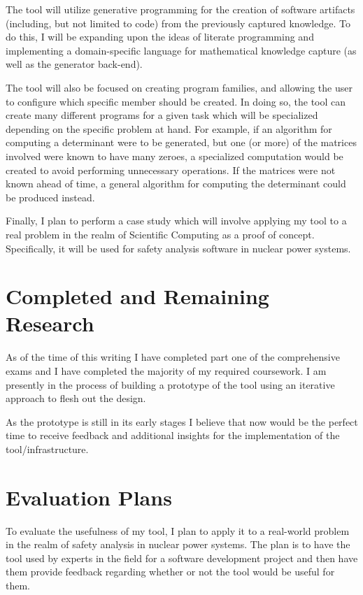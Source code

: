 \documentclass[11pt]{article} %
\begin{document}
The tool will utilize generative programming for the creation of software
artifacts (including, but not limited to code) from the previously captured
knowledge. To do this, I will be expanding upon the ideas of literate
programming and implementing a domain-specific language for mathematical
knowledge capture (as well as the generator back-end).

The tool will also be focused on creating program families, and allowing the
user to configure which specific member should be created. In doing so, the tool
can create many different programs for a given task which will be specialized
depending on the specific problem at hand. For example, if an algorithm for
computing a determinant were to be generated, but one (or more) of the matrices
involved were known to have many zeroes, a specialized computation would be
created to avoid performing unnecessary operations. If the matrices were not
known ahead of time, a general algorithm for computing the determinant could be
produced instead.

Finally, I plan to perform a case study which will involve applying my tool to
a real problem in the realm of Scientific Computing as a proof of concept.
Specifically, it will be used for safety analysis software in nuclear power
systems.

\section{Completed and Remaining Research}

As of the time of this writing I have completed part one of the
comprehensive exams and I have completed the majority of my required
coursework. I am presently in the process of building a prototype of the tool
using an iterative approach to flesh out the design.

As the prototype is still in its early stages I
believe that now would be the perfect time to receive feedback and 
additional insights for the implementation of the tool/infrastructure.

\section{Evaluation Plans}

To evaluate the usefulness of my tool, I plan to apply it to a real-world
problem in the realm of safety analysis in nuclear power systems. The plan is to
have the tool used by experts in the field for a software development project
and then have them provide feedback regarding whether or not the tool would be
useful for them.
\end{document}

